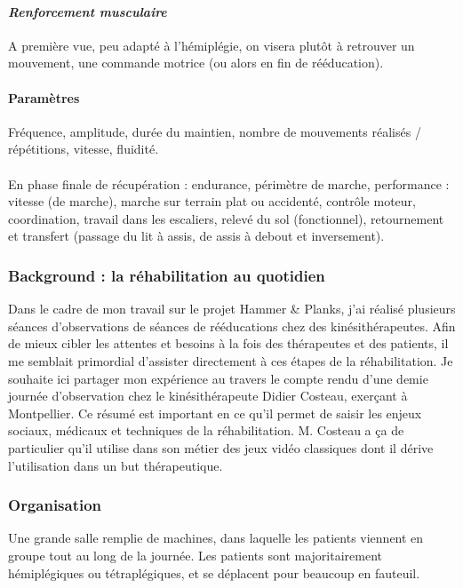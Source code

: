 	\paragraph{\emph{Renforcement musculaire} \\ }
A première vue, peu adapté à l’hémiplégie, on visera plutôt à retrouver un mouvement, une commande motrice (ou alors en fin de rééducation).

	\paragraph{Paramètres \\}
Fréquence, amplitude, durée du maintien, nombre de mouvements réalisés / répétitions, vitesse, fluidité.

\paragraph{}En phase finale de récupération : endurance, périmètre de marche, performance : vitesse (de marche), marche sur terrain plat ou accidenté, contrôle moteur, coordination, travail dans les escaliers, relevé du sol (fonctionnel), retournement et transfert (passage du lit à assis, de assis à debout et inversement).

	\subsubsection{Background : la réhabilitation au quotidien}
Dans le cadre de mon travail sur le projet Hammer \& Planks, j'ai réalisé plusieurs séances d'observations de séances de rééducations chez des kinésithérapeutes. Afin de mieux cibler les attentes et besoins à la fois des thérapeutes et des patients, il me semblait primordial d'assister directement à ces étapes de la réhabilitation. Je souhaite ici partager mon expérience au travers le compte rendu d'une demie journée d'observation chez le kinésithérapeute Didier Costeau, exerçant à Montpellier. Ce résumé est important en ce qu'il permet de saisir les enjeux sociaux, médicaux et techniques de la réhabilitation. M. Costeau a ça de particulier qu'il utilise dans son métier des jeux vidéo classiques dont il dérive l'utilisation dans un but thérapeutique.

	\subsubsection*{Organisation}
Une grande salle remplie de machines, dans laquelle les patients viennent en groupe tout au long de la journée. Les patients sont majoritairement hémiplégiques ou tétraplégiques, et se déplacent pour beaucoup en fauteuil.


